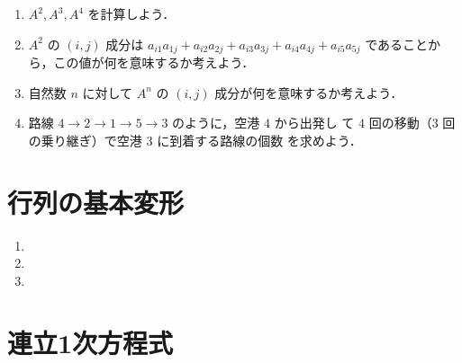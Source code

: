 \documentclass[11pt, uplatex, dvipdfmx]{jsarticle}
\begin{document}
\begin{enumerate}[label=\ref{sec:matrix}.\arabic*]
\begin{enumerate}[label=(\arabic*)]
  \item $A^2, A^3, A^4$ を計算しよう．

  \item $A^2$ の $(i,j)$ 成分は
    $a_{i1} a_{1j} + a_{i2}a_{2j} + a_{i3}a_{3j} + a_{i4}a_{4j} +
    a_{i5}a_{5j}$ であることから，この値が何を意味するか考えよう．

  \item 自然数 $n$ に対して $A^n$ の $(i,j)$ 成分が何を意味するか考えよう．

  \item 路線 $4 \to 2 \to 1 \to 5 \to 3$ のように，空港 $4$ から出発し
    て $4$ 回の移動（$3$ 回の乗り継ぎ）で空港 $3$ に到着する路線の個数
    を求めよう．
  \end{enumerate}


\end{enumerate}

\section{行列の基本変形}\label{sec:transform}

\begin{enumerate}[label=\ref{sec:transform}.\arabic*]
  \setlength{\itemsep}{1zh}
  
\item

\item

\item
  
\end{enumerate}

\newpage

\section{連立1次方程式}\label{sec:system}
\end{document}
